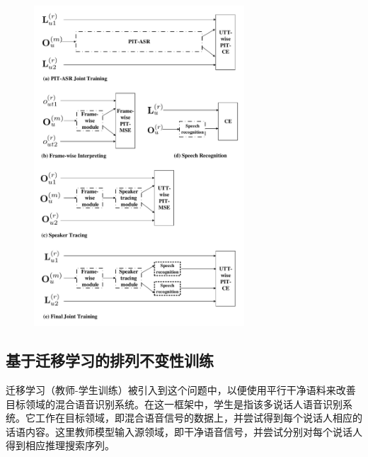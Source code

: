 \begin{figure}[!htp]
  \centering
    \captionstyle{\centering}
    \includegraphics[width=0.7\textwidth]{figure/modules.pdf}
\end{figure}


\subsection{基于迁移学习的排列不变性训练}
\label{chap:intro2-pit-ts}

迁移学习（教师-学生训练）被引入到这个问题中，以便使用平行干净语料来改善目标领域的混合语音识别系统。在这一框架中，学生是指该多说话人语音识别系统。它工作在目标领域，即混合语音信号的数据上，并尝试得到每个说话人相应的话语内容。这里教师模型输入源领域，即干净语音信号，并尝试分别对每个说话人得到相应推理搜索序列。



